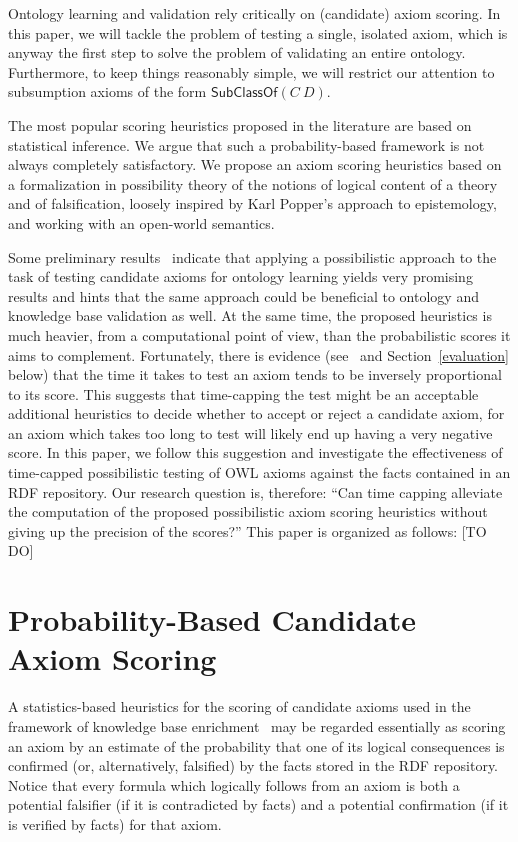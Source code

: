 \documentclass{llncs}
\begin{document}
Ontology learning and validation rely critically on (candidate) axiom scoring.
In this paper, we will tackle the problem of testing a single, isolated axiom,
which is anyway the first step to solve the problem of validating an entire ontology.
Furthermore, to keep things reasonably simple, we will restrict our attention
to subsumption axioms of the form $\mathsf{SubClassOf}(C\ D)$.

The most popular scoring heuristics proposed in the literature are based on statistical inference.
We argue that such a probability-based framework is not always completely satisfactory.
We propose an axiom scoring heuristics based on a formalization in possibility theory of
the notions of logical content of a theory and of falsification, loosely inspired
by Karl Popper's approach to epistemology, and working with an open-world semantics.

Some preliminary results~\cite{TettamanziFaronZuckerGandon2014ekaw} indicate that
applying a possibilistic approach to the task of testing candidate axioms
for ontology learning yields very promising results and hints that the same approach
could be beneficial to ontology and knowledge base validation as well.
At the same time, the proposed heuristics is much heavier, from a computational
point of view, than the probabilistic scores it aims to complement.
Fortunately, there is evidence (see~\cite{TettamanziFaronZuckerGandon2014ekaw} and
Section~\ref{evaluation} below) that the time it takes to test an axiom
tends to be inversely proportional to its score.
This suggests that time-capping the test might be an acceptable additional heuristics
to decide whether to accept or reject a candidate axiom, for an axiom which takes
too long to test will likely end up having a very negative score.
In this paper, we follow this suggestion and investigate the effectiveness
of time-capped possibilistic testing of OWL axioms against the facts contained
in an RDF repository.
Our research question is, therefore: ``Can time capping alleviate the computation
of the proposed possibilistic axiom scoring heuristics without giving up
the precision of the scores?''
This paper is organized as follows: [TO DO]

\section{Probability-Based Candidate Axiom Scoring}
\label{probability}

A statistics-based heuristics for the scoring of candidate axioms used
in the framework of knowledge base enrichment~\cite{BuehmannLehmann2012}
may be regarded essentially as scoring an axiom by an estimate of the probability
that one of its logical consequences is confirmed (or, alternatively, falsified)
by the facts stored in the RDF repository.
Notice that every formula which logically follows from an axiom is both
a potential falsifier (if it is contradicted by facts)
and a potential confirmation (if it is verified by facts) for that axiom.
\end{document}
